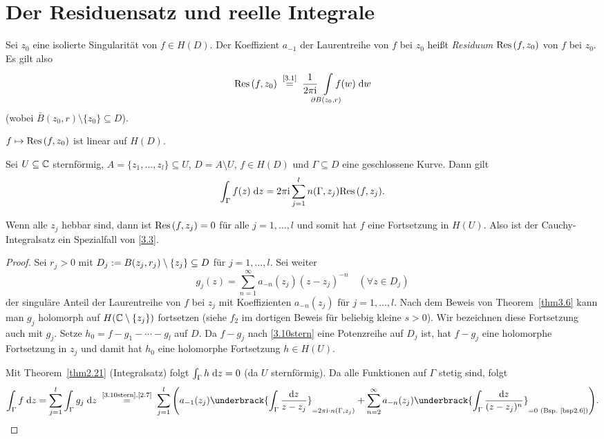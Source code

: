 \documentclass[a4paper,twoside,DIV15,BCOR12mm]{scrbook}
\begin{document}
\section{Der Residuensatz und reelle Integrale}

\begin{dfn} \label{dfn2.9}
  Sei $z_0$ eine isolierte Singularität von $f\in H(D)$. Der Koeffizient $a_{-1}$ der Laurentreihe von $f$ bei $z_0$ heißt
  \emph{Residuum} $\mathrm{Res}\left(f,z_0\right)$ von $f$ bei $z_0$. Es gilt also
  \[ \Res{f}{z_0} \nach{=}{\eqref{3.1}} \frac{1}{2\pi\i} \!\!\!\!\Integral{\partial B(z_0,r)}{}{\!\!\!\!\!\!f(w)}{w} \]
  (wobei $\bar{B}(z_0,r)\setminus\{z_0\} \subseteq D$).
\end{dfn}
\begin{bem*}
  $f\mapsto\mathrm{Res}\left(f,z_0\right)$ ist linear auf $H(D)$.
\end{bem*}

\begin{thm}[Residuensatz] \label{thm3.10}
  Sei $U\subseteq\mathbb{C}$ sternförmig, $A=\{z_1,\dotsc,z_l\}\subseteq U$, $D=A\setminus U$, $f\in H(D)$ und $\Gamma\subseteq D$ eine
  geschlossene Kurve. Dann gilt
  \begin{equation} \label{3.3}
    \int_{\Gamma}^{}{f(z)}\;\mathrm{d} z = 2\pi\mathrm{i} \sum_{j=1}^l{n(\Gamma,z_j)\mathrm{Res}\left(f,z_j\right)}.
  \end{equation}
\end{thm}
\begin{bem*}
  Wenn alle $z_j$ hebbar sind, dann ist $\mathrm{Res}\left(f,z_j\right)=0$ für alle $j=1,\dotsc,l$ und somit hat $f$ eine Fortsetzung in
  $H(U)$. Also ist der Cauchy-Integralsatz ein Spezialfall von \eqref{3.3}.
\end{bem*}
\begin{proof}
  Sei $r_j>0$ mit $D_j:= B(z_j,r_j)\setminus\{z_j\} \subseteq D$ für $j=1,\dotsc,l$. Sei weiter
  \begin{equation*} \label{3.10stern}
    g_j(z) = \sum_{n=1}^\infty {a_{-n}(z_j)(z-z_j)^{-n}} \quad (\forall z\in D_j) \tag{$*$}
  \end{equation*}
  der singuläre Anteil der Laurentreihe von $f$ bei $z_j$ mit Koeffizienten $a_{-n}(z_j)$ für $j=1,\dotsc,l$. Nach dem Beweis
  von Theorem~\ref{thm3.6} kann man $g_j$ holomorph auf $H(\mathbb{C}\setminus\{z_j\})$ fortsetzen (siehe $f_2$ im dortigen Beweis für
  beliebig kleine $s>0$). Wir bezeichnen diese Fortsetzung auch mit $g_j$. Setze $h_0=f-g_1-\dotsb-g_l$ auf $D$. Da $f-g_j$ nach
  \eqref{3.10stern} eine Potenzreihe auf $D_j$ ist, hat $f-g_j$ eine holomorphe Fortsetzung in $z_j$ und damit hat $h_0$ eine
  holomorphe Fortsetzung $h\in H(U)$.

  Mit Theorem~\ref{thm2.21} (Integralsatz) folgt $\int_{\Gamma}^{}{h}\;\mathrm{d} z=0$ (da $U$ sternförmig). Da alle Funktionen auf
  $\Gamma$ stetig sind, folgt
  \[ \integral{\Gamma}{}{f}{z} = \sum_{j=1}^l{\integral{\Gamma}{}{g_j}{z}} \nach{=}{\eqref{3.10stern},\eqref{2.7}}
  \sum_{j=1}^l{\Biggl(a_{-1}(z_j) \underbrack{\int_\Gamma{\frac{\d z}{z-z_j}}}_{=2\pi\i\cdot n(\Gamma,z_j)} +
      \sum_{n=2}^\infty{a_{-n}(z_j) \underbrack{\int_\Gamma{\frac{\d z}{(z-z_j)^n}}}_{=0\text{ (Bsp.~\ref{bsp2.6})}}} \Biggr)}. \qedhere \]
\end{proof}
\end{document}
